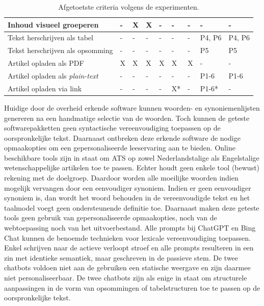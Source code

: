 \begin{table}[H]
\begin{tabular}{ | m{8cm} | m{0.5cm} | m{0.5cm} | m{0.5cm} | m{0.5cm} | m{0.5cm} | m{0.5cm} | m{1cm} | m{1cm} | }
		Inhoud visueel groeperen & - & X & X & - & - & - & - & - \\ \hline
		Tekst herschrijven als tabel & - & - & - & - & - & - & P4, P6 & P4, P6 \\ \hline
		Tekst herschrijven als opsomming & - & - & - & - & - & - & P5 & P5 \\ \hline
		Artikel opladen als PDF & X & X & X & X & X & X & - & - \\ \hline
		Artikel opladen als \textit{plain-text} & - & - & - & - & - & - & P1-6 & P1-6 \\ \hline
		Artikel opladen via link & - & - & - & - & X* & - & P1-6* & - \\ \hline
	\end{tabular}
	\caption{Afgetoetste criteria volgens de experimenten.}
	\label{table:afgetoetste-criteria}
\end{table}

Huidige door de overheid erkende software kunnen woorden- en synoniemenlijsten genereren na een handmatige selectie van de woorden. Toch kunnen de geteste softwarepakketten geen syntactische vereenvoudiging toepassen op de oorspronkelijke tekst. Daarnaast ontbreken deze erkende software de nodige opmaakopties om een gepersonaliseerde leeservaring aan te bieden. Online beschikbare tools zijn in staat om ATS op zowel Nederlandstalige als Engelstalige wetenschappelijke artikelen toe te passen. Echter houdt geen enkele tool (bewust) rekening met de doelgroep. Daardoor worden alle moeilijke woorden indien mogelijk vervangen door een eenvoudiger synoniem. Indien er geen eenvoudiger synoniem is, dan wordt het woord behouden in de vereenvoudigde tekst en het taalmodel voegt geen ondersteunende definitie toe. Daarnaast maken deze geteste tools geen gebruik van gepersonaliseerde opmaakopties, noch van de webtoepassing noch van het uitvoerbestand. Alle prompts bij ChatGPT en Bing Chat kunnen de benoemde technieken voor lexicale vereenvoudiging toepassen. Enkel schrijven naar de actieve verloopt stroef en alle prompts resulteren in een zin met identieke semantiek, maar geschreven in de passieve stem. De twee chatbots voldoen niet aan de gebruiken een statische weergave en zijn daarmee niet personaliseerbaar. De twee chatbots zijn als enige in staat om structurele aanpassingen in de vorm van opsommingen of tabelstructuren toe te passen op de oorspronkelijke tekst.

\medspace


